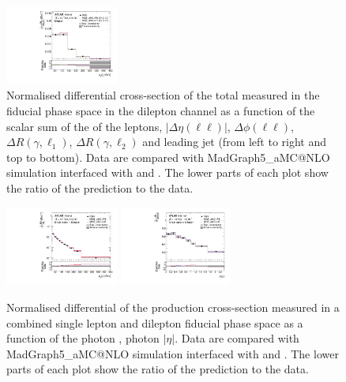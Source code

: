 \begin{figure}[ht]
  \includegraphics[width=0.33\textwidth]{figures/diff_xsec/normalized-unfolded-distributions/tty_total_dilep/DL_tty_total_ptj1_unfolded_normalized.pdf}%
    \caption{Normalised differential cross-section of the \tty total measured in the fiducial phase space in the dilepton channel as a function of the scalar sum of the \pt of the leptons, $|\Delta \eta(\ell\ell)|$, $\Delta \phi (\ell\ell)$, $\Delta R (\gamma, \ell_1)$, $\Delta R (\gamma, \ell_2)$ and leading jet \pt (from left to right and top to bottom). Data are compared with MadGraph5\_aMC@NLO simulation interfaced with \PYTHIA[8] and \HERWIG[7]. The lower parts of each plot show the ratio of the prediction to the data.}
  \label{fig:tty_total_diff_DL2_norm}
\end{figure}
\FloatBarrier

\begin{figure}[ht]
  \centering
  \includegraphics[width=0.33\textwidth]{figures/diff_xsec/normalized-unfolded-distributions/tty_prod_SLDL/tty_pt_UnfoldedData.pdf}%
  \includegraphics[width=0.33\textwidth]{figures/diff_xsec/normalized-unfolded-distributions/tty_prod_SLDL/tty_eta_UnfoldedData.pdf}%
  \caption{Normalised differential of the \tty production 
  cross-section measured in a combined single lepton and dilepton fiducial phase space as a function of the photon \pt, photon $|\eta|$.
  Data are compared with MadGraph5\_aMC@NLO
  simulation interfaced with \PYTHIA[8] and \HERWIG[7]. The lower parts of each
  plot show the ratio of the prediction to the data. }

  \label{fig:tty_prod_diff_SLDL_norm}
\end{figure}
\FloatBarrier


